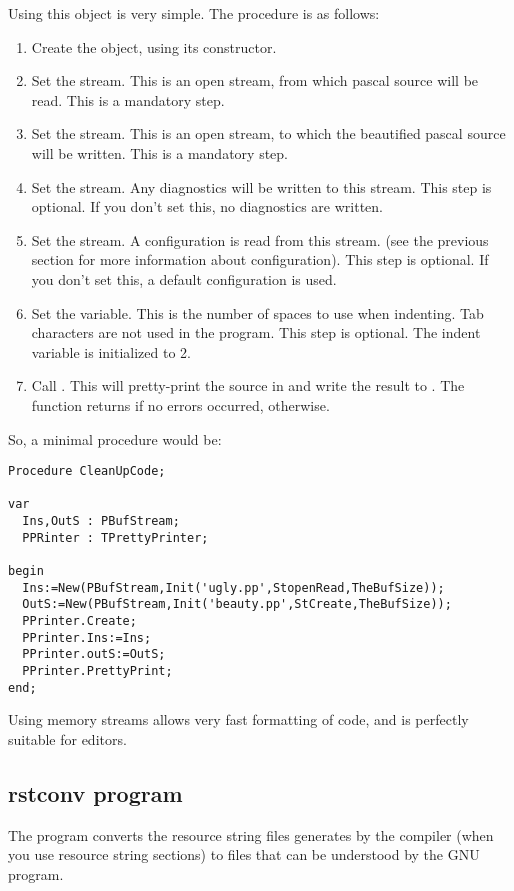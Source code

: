 Using this object is very simple. The procedure is as follows:
\begin{enumerate}
\item Create the object, using its constructor.
\item Set the  stream. This is an open stream, from which pascal source will be
read. This is a mandatory step.
\item Set the  stream. This is an open stream, to which the
beautified pascal source will be written. This is a mandatory step.
\item Set the  stream. Any diagnostics will be written to this
stream. This step is optional. If you don't set this, no diagnostics are
written.
\item Set the  stream. A configuration is read from this stream.
(see the previous section for more information about configuration). This
step is optional. If you don't set this, a default configuration is used.
\item Set the  variable. This is the number of spaces to use
when indenting. Tab characters are not used in the program. This step is
optional. The indent variable is initialized to 2.
\item Call . This will pretty-print the source in 
and write the result to . The function returns  if no
errors occurred,  otherwise.
\end{enumerate}

So, a minimal procedure would be:
\begin{verbatim}
Procedure CleanUpCode;

var
  Ins,OutS : PBufStream;
  PPRinter : TPrettyPrinter;

begin
  Ins:=New(PBufStream,Init('ugly.pp',StopenRead,TheBufSize));
  OutS:=New(PBufStream,Init('beauty.pp',StCreate,TheBufSize));
  PPrinter.Create;
  PPrinter.Ins:=Ins;
  PPrinter.outS:=OutS;
  PPrinter.PrettyPrint;
end;
\end{verbatim}

Using memory streams allows very fast formatting of code, and is perfectly
suitable for editors.

\subsection{rstconv program}

The  program converts the resource string files generates by
the compiler (when you use resource string sections) to  files
that can be understood by the GNU  program.

